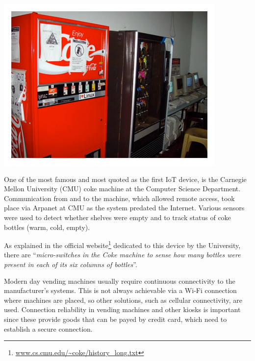 			\noindent
			\begin{minipage}{0.5\textwidth}%
				\centering
				\includegraphics[width=\textwidth]{resources/img/chap2/coke}
			\end{minipage}%
			\hfill%
			\begin{minipage}{0.5\textwidth}\raggedright
				One of the most famous and most quoted as the first IoT device, is the Carnegie Mellon University (CMU) coke machine at the Computer Science Department.
				Communication from and to the machine, which allowed remote access, took place via Arpanet at CMU as the system predated the Internet.
				Various sensors were used to detect whether shelves were empty and to track status of coke bottles (warm, cold, empty).
			\end{minipage}
			\newline
			
			As explained in the official website\footnote{ \url{www.cs.cmu.edu/~coke/history_long.txt}} dedicated to this device by the University, there are ``\textit{micro-switches in the Coke machine to sense how many bottles were present in each of its six columns of bottles}''.
		
			Modern day vending machines usually require continuous connectivity to the manufacturer's systems.
			This is not always achievable via a Wi-Fi connection where machines are placed, so other solutions, such as cellular connectivity, are used.
			Connection reliability in vending machines and other kiosks is important since these provide goods that can be payed by credit card, which need to establish a secure connection.
			
